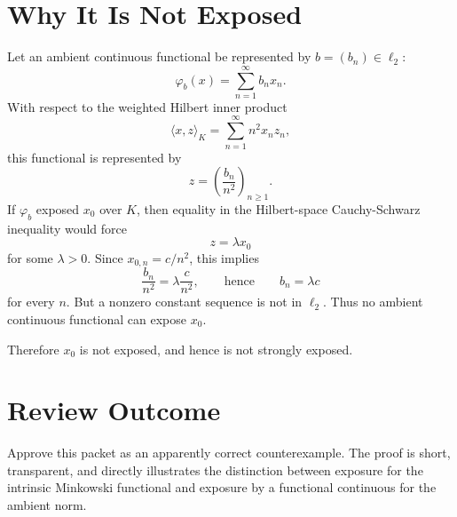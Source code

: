 \documentclass[11pt]{article}
\begin{document}
\section*{Why It Is Not Exposed}

Let an ambient continuous functional be represented by \(b=(b_n)\in\ell_2\):
\[
  \varphi_b(x)=\sum_{n=1}^\infty b_nx_n.
\]
With respect to the weighted Hilbert inner product
\[
  \langle x,z\rangle_K=\sum_{n=1}^\infty n^2x_nz_n,
\]
this functional is represented by
\[
  z=\left(\frac{b_n}{n^2}\right)_{n\geq1}.
\]
If \(\varphi_b\) exposed \(x_0\) over \(K\), then equality in the Hilbert-space
Cauchy-Schwarz inequality would force
\[
  z=\lambda x_0
\]
for some \(\lambda>0\).  Since \(x_{0,n}=c/n^2\), this implies
\[
  \frac{b_n}{n^2}=\lambda\frac{c}{n^2},
  \qquad\text{hence}\qquad
  b_n=\lambda c
\]
for every \(n\).  But a nonzero constant sequence is not in \(\ell_2\).  Thus
no ambient continuous functional can expose \(x_0\).

Therefore \(x_0\) is not exposed, and hence is not strongly exposed.

\section*{Review Outcome}

Approve this packet as an apparently correct counterexample.  The proof is
short, transparent, and directly illustrates the distinction between exposure
for the intrinsic Minkowski functional and exposure by a functional continuous
for the ambient norm.
\end{document}
